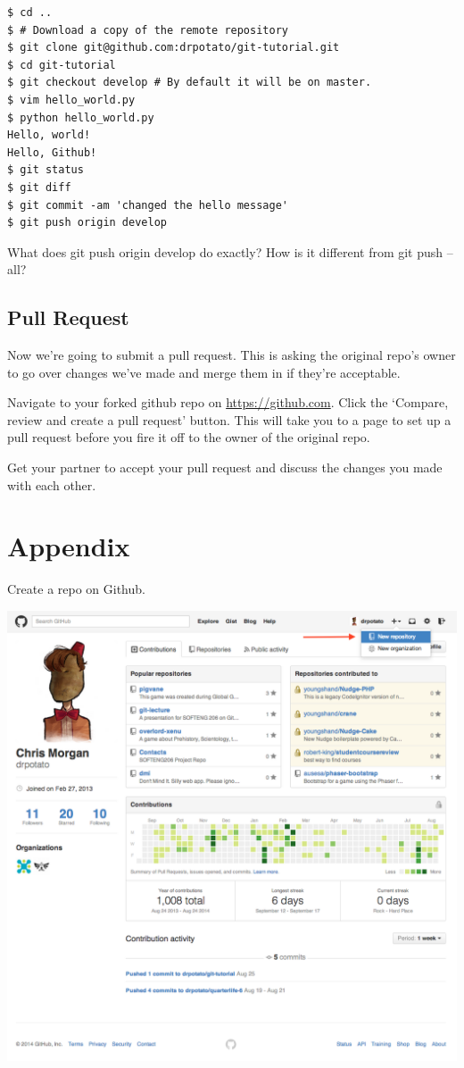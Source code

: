 \documentclass{tufte-handout}
\begin{document}
\begin{lstlisting}
$ cd ..
$ # Download a copy of the remote repository
$ git clone git@github.com:drpotato/git-tutorial.git
$ cd git-tutorial
$ git checkout develop # By default it will be on master.
$ vim hello_world.py
$ python hello_world.py
Hello, world!
Hello, Github!
$ git status
$ git diff
$ git commit -am 'changed the hello message'
$ git push origin develop
\end{lstlisting}

\noindent What does git push origin develop do exactly? How is it different
from git push --all?

\subsection{Pull Request}

\noindent Now we're going to submit a pull request. This is asking the original
repo's owner to go over changes we've made and merge them in if they're
acceptable.

\noindent Navigate to your forked github repo on \url{https://github.com}.
Click the `Compare, review and create a pull request' button. This will take
you to a page to set up a pull request before you fire it off to the owner of
the original repo.

\noindent Get your partner to accept your pull request and discuss the changes
you made with each other.

\pagebreak
\appendix
\section{Appendix}

Create a repo on Github.

\includegraphics[scale=0.4]{img/github-create-repo.png}
\end{document}
